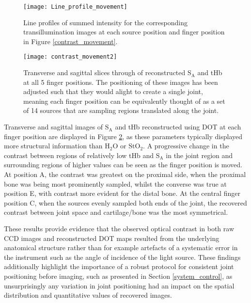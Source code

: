 \documentclass[twoside]{bhamthesis}
\theoremstyle{definition}
\begin{document}

\begin{figure}[!ht]
\centering\texttt{[image: Line\_profile\_movement]}
\caption{Line profiles of summed intensity for the corresponding transillumination images at each source position and finger position in Figure \ref{contrast_movement}.}
\label{lin_profile_movement}
\end{figure}

\begin{figure}[!ht]
\centering\texttt{[image: contrast\_movement2]}
\caption{Transverse and sagittal slices through of reconstructed $\mathrm{S_A}$ and tHb at all 5 finger positions. The positioning of these images has been adjusted such that they would alight to create a single joint, meaning each finger position can be equivalently thought of as a set of 14 sources that are sampling regions translated along the joint. }
\label{movement_recon}
\end{figure}

Transverse and sagittal images of $\mathrm{S_A}$ and tHb reconstructed using DOT at each finger position are displayed in Figure 
\ref{movement_recon}, as these parameters typically displayed more structural information than $\mathrm{H_2O}$ or $\mathrm{StO_2}$. A progressive change in the contrast between regions of relatively low tHb and $\mathrm{S_A}$ in the joint region and surrounding regions of higher values can be seen as the finger position is moved. At position A, the contrast was greatest on the proximal side, when the proximal bone was being most prominently sampled, whilst the converse was true at position E, with contrast more evident for the distal bone. At the central finger position C, when the sources evenly sampled both ends of the joint, the recovered contrast between joint space and cartilage/bone was the most symmetrical.

These results provide evidence that the observed optical contrast in both raw CCD images and reconstructed DOT maps resulted from the underlying anatomical structure rather than for example artefacts of a systematic error in the instrument such as the angle of incidence of the light source. These findings additionally highlight the importance of a robust protocol for consistent joint positioning before imaging, such as presented in Section \ref{system_control}, as unsurprisingly any variation in joint positioning had an impact on the spatial distribution and quantitative values of recovered images.
\end{document}
